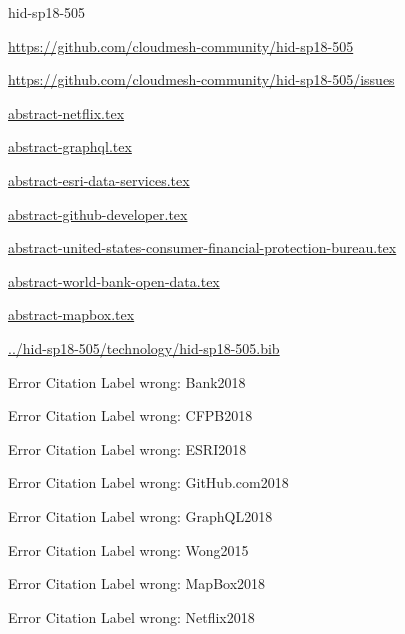 \begin{IU}

hid-sp18-505

\url{https://github.com/cloudmesh-community/hid-sp18-505}

\url{https://github.com/cloudmesh-community/hid-sp18-505/issues}

\href{https://github.com/cloudmesh-community/hid-sp18-505/blob/master//technology/abstract-netflix.tex}{abstract-netflix.tex}

\href{https://github.com/cloudmesh-community/hid-sp18-505/blob/master//technology/abstract-graphql.tex}{abstract-graphql.tex}

\href{https://github.com/cloudmesh-community/hid-sp18-505/blob/master//technology/abstract-esri-data-services.tex}{abstract-esri-data-services.tex}

\href{https://github.com/cloudmesh-community/hid-sp18-505/blob/master//technology/abstract-github-developer.tex}{abstract-github-developer.tex}

\href{https://github.com/cloudmesh-community/hid-sp18-505/blob/master//technology/abstract-united-states-consumer-financial-protection-bureau.tex}{abstract-united-states-consumer-financial-protection-bureau.tex}

\href{https://github.com/cloudmesh-community/hid-sp18-505/blob/master//technology/abstract-world-bank-open-data.tex}{abstract-world-bank-open-data.tex}

\href{https://github.com/cloudmesh-community/hid-sp18-505/blob/master//technology/abstract-mapbox.tex}{abstract-mapbox.tex}

\href{https://github.com/cloudmesh-community/hid-sp18-505/blob/master//technology/hid-sp18-505.bib}{../hid-sp18-505/technology/hid-sp18-505.bib}

 Error Citation Label wrong: Bank2018

 Error Citation Label wrong: CFPB2018

 Error Citation Label wrong: ESRI2018

 Error Citation Label wrong: GitHub.com2018

 Error Citation Label wrong: GraphQL2018

 Error Citation Label wrong: Wong2015

 Error Citation Label wrong: MapBox2018

 Error Citation Label wrong: Netflix2018

\end{IU}


